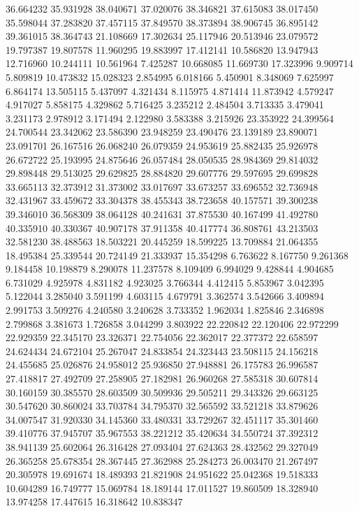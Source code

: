 36.664232
35.931928
38.040671
37.020076
38.346821
37.615083
38.017450
35.598044
37.283820
37.457115
37.849570
38.373894
38.906745
36.895142
39.361015
38.364743
21.108669
17.302634
25.117946
20.513946
23.079572
19.797387
19.807578
11.960295
19.883997
17.412141
10.586820
13.947943
12.716960
10.244111
10.561964
7.425287
10.668085
11.669730
17.323996
9.909714
5.809819
10.473832
15.028323
2.854995
6.018166
5.450901
8.348069
7.625997
6.864174
13.505115
5.437097
4.321434
8.115975
4.871414
11.873942
4.579247
4.917027
5.858175
4.329862
5.716425
3.235212
2.484504
3.713335
3.479041
3.231173
2.978912
3.171494
2.122980
3.583388
3.215926
23.353922
24.399564
24.700544
23.342062
23.586390
23.948259
23.490476
23.139189
23.890071
23.091701
26.167516
26.068240
26.079359
24.953619
25.882435
25.926978
26.672722
25.193995
24.875646
26.057484
28.050535
28.984369
29.814032
29.898448
29.513025
29.629825
28.884820
29.607776
29.597695
29.699828
33.665113
32.373912
31.373002
33.017697
33.673257
33.696552
32.736948
32.431967
33.459672
33.304378
38.455343
38.723658
40.157571
39.300238
39.346010
36.568309
38.064128
40.241631
37.875530
40.167499
41.492780
40.335910
40.330367
40.907178
37.911358
40.417774
36.808761
43.213503
32.581230
38.488563
18.503221
20.445259
18.599225
13.709884
21.064355
18.495384
25.339544
20.724149
21.333937
15.354298
6.763622
8.167750
9.261368
9.184458
10.198879
8.290078
11.237578
8.109409
6.994029
9.428844
4.904685
6.731029
4.925978
4.831182
4.923025
3.766344
4.412415
5.853967
3.042395
5.122044
3.285040
3.591199
4.603115
4.679791
3.362574
3.542666
3.409894
2.991753
3.509276
4.240580
3.240628
3.733352
1.962034
1.825846
2.346898
2.799868
3.381673
1.726858
3.044299
3.803922
22.220842
22.120406
22.972299
22.929359
22.345170
23.326371
22.754056
22.362017
22.377372
22.658597
24.624434
24.672104
25.267047
24.833854
24.323443
23.508115
24.156218
24.455685
25.026876
24.958012
25.936850
27.948881
26.175783
26.996587
27.418817
27.492709
27.258905
27.182981
26.960268
27.585318
30.607814
30.160159
30.385570
28.603509
30.509936
29.505211
29.343326
29.663125
30.547620
30.860024
33.703784
34.795370
32.565592
33.521218
33.879626
34.007547
31.920330
34.145360
33.480331
33.729267
32.451117
35.301460
39.410776
37.945707
35.967553
38.221212
35.420634
34.550724
37.392312
38.941139
25.602064
26.316428
27.093404
27.624363
28.432562
29.327049
26.365258
25.678354
28.367445
27.362988
25.284273
26.003470
21.267497
20.305978
19.691674
18.489393
21.821908
24.951622
25.042368
19.518333
10.604289
16.749777
15.069784
18.189144
17.011527
19.860509
18.328940
13.974258
17.447615
16.318642
10.838347
